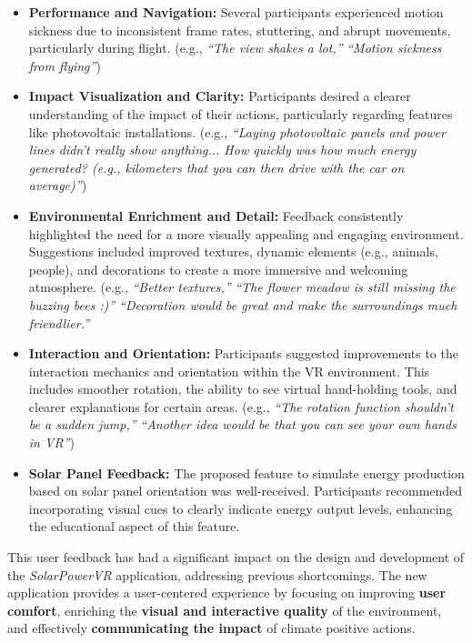 \documentclass[draft, final]{vutinfth} %
\begin{document}
\begin{itemize}
    \item \textbf{Performance and Navigation:} Several participants experienced motion sickness due to inconsistent frame rates, stuttering, and abrupt movements, particularly during flight. (e.g., \textit{``The view shakes a lot,''} \textit{``Motion sickness from flying''})
    \item \textbf{Impact Visualization and Clarity:} Participants desired a clearer understanding of the impact of their actions, particularly regarding features like photovoltaic installations. (e.g., \textit{``Laying photovoltaic panels and power lines didn't really show anything... How quickly was how much energy generated? (e.g., kilometers that you can then drive with the car on average)''})
    \item \textbf{Environmental Enrichment and Detail:} Feedback consistently highlighted the need for a more visually appealing and engaging environment. Suggestions included improved textures, dynamic elements (e.g., animals, people), and decorations to create a more immersive and welcoming atmosphere. (e.g., \textit{``Better textures,''} \textit{``The flower meadow is still missing the buzzing bees :)''} \textit{``Decoration would be great and make the surroundings much friendlier.''} 
    \item \textbf{Interaction and Orientation:}  Participants suggested improvements to the interaction mechanics and orientation within the VR environment. This includes smoother rotation, the ability to see virtual hand-holding tools, and clearer explanations for certain areas. (e.g., \textit{``The rotation function shouldn't be a sudden jump,''} \textit{``Another idea would be that you can see your own hands in VR''})
    \item \textbf{Solar Panel Feedback:} The proposed feature to simulate energy production based on solar panel orientation was well-received. Participants recommended incorporating visual cues to clearly indicate energy output levels, enhancing the educational aspect of this feature.
\end{itemize}

This user feedback has had a significant impact on the design and development of the \textit{SolarPowerVR} application, addressing previous shortcomings. The new application provides a user-centered experience by focusing on improving \textbf{user comfort}, enriching the \textbf{visual and interactive quality} of the environment, and effectively \textbf{communicating the impact} of climate positive actions.
\end{document}

